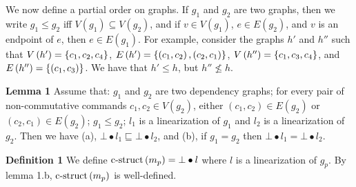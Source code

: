 We now define a partial order on graphs. If $g_1$ and $g_2$ are two graphs, then we write $g_1 \leq g_2$ iff $V\left( g_1 \right)\subseteq V\left( g_2 \right)$, and if $v\in V\left( g_1 \right)$, $e\in E\left( g_2 \right)$, and $v$ is an endpoint of $e$, then $e\in E\left( g_1 \right)$. 
For example, consider the graphs $h'$ and $h''$ such that $V\left( h' \right)=\left\{c_1,c_2,c_4\right\}$, $E\left( h' \right)=\left\{\left( c_1,c_2 \right),\left( c_2,c_1 \right)\right\}$, $V\left( h'' \right)=\left\{c_1,c_3,c_4\right\}$, and $E\left( h'' \right)=\left\{\left( c_1,c_3 \right)\right\}$. We have that $h'\leq h$, but $ h''\not\leq h$.

\textbf{Lemma 1}
Assume that: $g_1$ and $g_2$ are two dependency graphs; 
for every pair of non-commutative commands $c_1,c_2 \in V\left(g_2\right)$, either $\left( c_1,c_2 \right)\in E\left( g_2 \right)$ or $\left( c_2,c_1 \right)\in E\left( g_2 \right)$;
$g_1 \leq g_2$;
$l_1$ is a linearization of $g_1$ and $l_2$ is a linearization of $g_2$. 
Then we have (a), $\bot\bullet l_1 \sqsubseteq \bot\bullet l_2$, and (b), if $g_1 = g_2$ then $\bot\bullet l_1 = \bot\bullet l_2$.

\textbf{Definition 1}
We define $\operatorname{c-struct}\left( m_p \right) = \bot\bullet l$ where $l$ is a linearization of $g_p$.
By lemma 1.b, $\operatorname{c-struct}\left( m_p \right)$ is well-defined.

